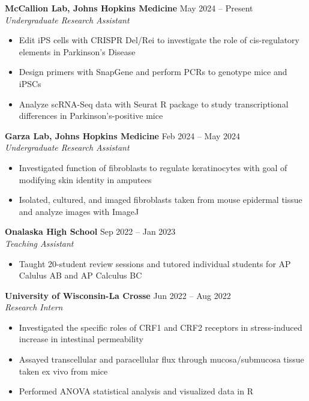 \documentclass[11pt]{article}       %
\begin{document}
\textbf{McCallion Lab, Johns Hopkins Medicine} \hfill May 2024 – Present \\
\textit{Undergraduate Research Assistant} \vspace{-9pt} \\
\begin{itemize}
  \item Edit iPS cells with CRISPR Del/Rei to investigate the role of cis-regulatory elements in Parkinson’s Disease
  \item Design primers with SnapGene and perform PCRs to genotype mice and iPSCs
  \item Analyze scRNA-Seq data with Seurat R package to study transcriptional differences in Parkinson’s-positive mice
\end{itemize}

\textbf{Garza Lab, Johns Hopkins Medicine} \hfill Feb 2024 – May 2024 \\
\textit{Undergraduate Research Assistant} \vspace{-9pt} \\
\begin{itemize}
  \item Investigated function of fibroblasts to regulate keratinocytes with goal of modifying skin identity in amputees
  \item Isolated, cultured, and imaged fibroblasts taken from mouse epidermal tissue and analyze images with ImageJ
\end{itemize}

\textbf{Onalaska High School} \hfill Sep 2022 – Jan 2023 \\
\textit{Teaching Assistant} \vspace{-9pt} \\
\begin{itemize}
  \item Taught 20-student review sessions and tutored individual students for AP Calulus AB and AP Calculus BC
\end{itemize}

\textbf{University of Wisconsin-La Crosse} \hfill Jun 2022 – Aug 2022 \\
\textit{Research Intern} \vspace{-9pt} \\
\begin{itemize}
  \item Investigated the specific roles of CRF1 and CRF2 receptors in stress-induced increase in intestinal permeability
  \item Assayed transcellular and paracellular flux through mucosa/submucosa tissue taken ex vivo from mice
  \item Performed ANOVA statistical analysis and visualized data in R
\end{itemize}
\end{document}
